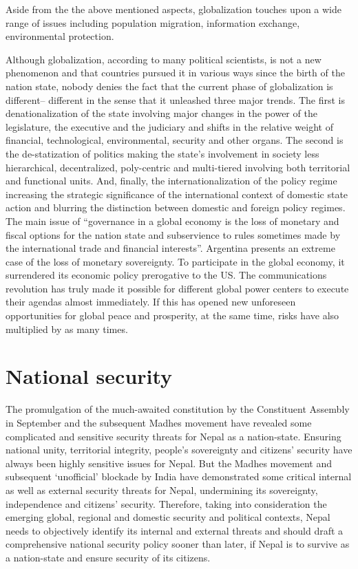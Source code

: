 \documentclass[
  openany]{book}
\begin{document}
Aside from the the above mentioned aspects, globalization touches upon a wide range of issues including population migration, information exchange, environmental protection.

Although globalization, according to many political scientists, is not a new phenomenon and that countries pursued it in various ways since the birth of the nation state, nobody denies the fact that the current phase of globalization is different-- different in the sense that it unleashed three major trends. The first is denationalization of the state involving major changes in the power of the legislature, the executive and the judiciary and shifts in the relative weight of financial, technological, environmental, security and other organs. The second is the de-statization of politics making the state's involvement in society less hierarchical, decentralized, poly-centric and multi-tiered involving both territorial and functional units. And, finally, the internationalization of the policy regime increasing the strategic significance of the international context of domestic state action and blurring the distinction between domestic and foreign policy regimes. The main issue of ``governance in a global economy is the loss of monetary and fiscal options for the nation state and subservience to rules sometimes made by the international trade and financial interests''. Argentina presents an extreme case of the loss of monetary sovereignty. To participate in the global economy, it surrendered its economic policy prerogative to the US. The communications revolution has truly made it possible for different global power centers to execute their agendas almost immediately. If this has opened new unforeseen opportunities for global peace and prosperity, at the same time, risks have also multiplied by as many times.

\hypertarget{national-security}{%
\section{National security}\label{national-security}}

The promulgation of the much-awaited constitution by the Constituent Assembly in September and the subsequent Madhes movement have revealed some complicated and sensitive security threats for Nepal as a nation-state. Ensuring national unity, territorial integrity, people's sovereignty and citizens' security have always been highly sensitive issues for Nepal. But the Madhes movement and subsequent `unofficial' blockade by India have demonstrated some critical internal as well as external security threats for Nepal, undermining its sovereignty, independence and citizens' security. Therefore, taking into consideration the emerging global, regional and domestic security and political contexts, Nepal needs to objectively identify its internal and external threats and should draft a comprehensive national security policy sooner than later, if Nepal is to survive as a nation-state and ensure security of its citizens.
\end{document}
